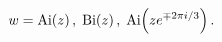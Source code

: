\[w=\mathop{\mathrm{Ai}\/}\nolimits\!\left(z\right),\;\mathop{\mathrm{Bi}\/}%
\nolimits\!\left(z\right),\;\mathop{\mathrm{Ai}\/}\nolimits\!\left(ze^{\mp 2%
\pi i/3}\right).\]